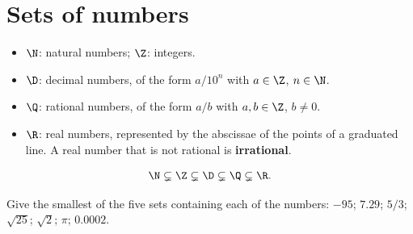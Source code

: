\section{Sets of numbers}
\begin{keypoint}[Definitions]
\begin{itemize}
\item $\N$: natural numbers; $\Z$: integers.
\item $\D$: decimal numbers, of the form $a/10^n$ with $a\in\Z$, $n\in\N$.
\item $\Q$: rational numbers, of the form $a/b$ with $a,b\in\Z$, $b\ne0$.
\item $\R$: real numbers, represented by the abscissae of the points of a graduated line. A real number that is not rational is \textbf{irrational}.
\end{itemize}
\[\N\subsetneq\Z\subsetneq\D\subsetneq\Q\subsetneq\R.\]
\end{keypoint}
\begin{center}\end{center}
\begin{example}Give the smallest of the five sets containing each of the numbers: $-95$; $\num{7,29}$; $5/3$; $\sqrt{25}$; $\sqrt2$; $\pi$; $\num{0,0002}$.\end{example}


